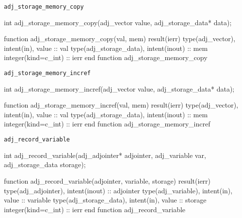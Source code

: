 
\begin{boxwithtitle}{\texttt{adj_storage_memory_copy}}
\begin{minipage}{\columnwidth}
\begin{ccode}
  int adj_storage_memory_copy(adj_vector value, adj_storage_data* data);
\end{ccode}
\begin{fortrancode}
  function adj_storage_memory_copy(val, mem) result(ierr)
    type(adj_vector), intent(in), value :: val
    type(adj_storage_data), intent(inout) :: mem
    integer(kind=c_int) :: ierr
  end function adj_storage_memory_copy
\end{fortrancode}
\end{minipage}
\end{boxwithtitle}


\begin{boxwithtitle}{\texttt{adj_storage_memory_incref}}
\begin{minipage}{\columnwidth}
\begin{ccode}
  int adj_storage_memory_incref(adj_vector value, adj_storage_data* data);
\end{ccode}
\begin{fortrancode}
  function adj_storage_memory_incref(val, mem) result(ierr)
    type(adj_vector), intent(in), value :: val
    type(adj_storage_data), intent(inout) :: mem
    integer(kind=c_int) :: ierr
  end function adj_storage_memory_incref
\end{fortrancode}
\end{minipage}
\end{boxwithtitle}


\begin{boxwithtitle}{\texttt{adj_record_variable}}
\begin{minipage}{\columnwidth}
\begin{ccode}
  int adj_record_variable(adj_adjointer* adjointer, adj_variable var, 
                          adj_storage_data storage);
\end{ccode}
\begin{fortrancode}
  function adj_record_variable(adjointer, variable, storage) result(ierr) 
    type(adj_adjointer), intent(inout) :: adjointer
    type(adj_variable), intent(in), value :: variable
    type(adj_storage_data), intent(in), value :: storage
    integer(kind=c_int) :: ierr
  end function adj_record_variable
\end{fortrancode}
\end{minipage}
\end{boxwithtitle}

